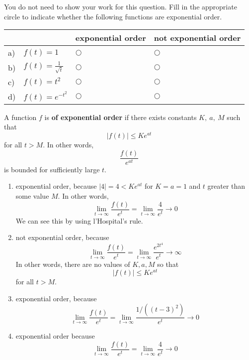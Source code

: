 \ifnum {}
\question[2] You do not need to show your work for this question. Fill in the appropriate circle to indicate whether the following functions are exponential order. 
\vspace{-0.2cm}
\setlength{\extrarowheight}{0.10cm}
\begin{center}
\hspace{-.9cm}\begin{tabular}{ p{0.20cm} p{4cm} p{3.5cm} p{4cm} }
    & & exponential order &  not exponential order  \\[2pt] \hline 
    a) & $f(t) = 1$ & $\bigcirc$  & $\bigcirc$ \\[4pt]  
    b) & $f(t) = \frac{1}{\sqrt t}$  & $\bigcirc$  & $\bigcirc$ \\[4pt] 
    c) & $f(t) = t^2$  & $\bigcirc$  & $\bigcirc$ \\[4pt] 
    d) & $f(t) = e^{-t^2}$  & $\bigcirc$  & $\bigcirc$ \\[4pt] 
    \hline
\end{tabular}
\end{center}
\setlength{\extrarowheight}{0.0cm}
\ifnum {} {\color{DarkBlue} A function 
$f$ is \textbf{of exponential order} if there exists constants $K, \ a, \ M$ such that $$  |f(t)| \leq Ke^{at}  $$ for all $t > M$. In other words, $$ \frac{f(t)}{e^{at}}  $$ is bounded for sufficiently large $t$.
\begin{enumerate}[label=(\alph*)]
    \item exponential order, because $|4| = 4 < Ke^{at}$ for $K=a=1$ and $t$ greater than some value $M$. In other words, $$\lim_{t\to \infty}\frac{f(t)}{e^t} = \lim_{t\to \infty}\frac{4}{e^t} \to 0$$ We can see this by using l'Hospital's rule. 
    \item not exponential order, because 
    $$\lim_{t\to \infty}\frac{f(t)}{e^t} = \lim_{t\to \infty}\frac{e^{2t^4}}{e^t} \to \infty$$ In other words, there are no values of $K,a,M$ so that $$  |f(t)| \leq Ke^{at}  $$ for all $t > M$.
    \item exponential order, because $$\lim_{t\to \infty}\frac{f(t)}{e^t} = \lim_{t\to \infty}\frac{1/((t-3)^2)}{e^t} \to 0$$    
    \item exponential order because $$\lim_{t\to \infty}\frac{f(t)}{e^t} = \lim_{t\to \infty}\frac{4}{e^t} \to 0$$
\end{enumerate}
}
\fi
\vspace{-6pt} 
\fi 




